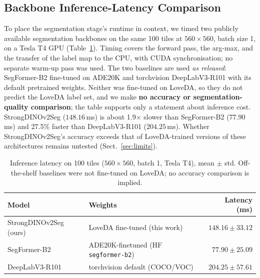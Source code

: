 \documentclass[runningheads]{llncs}
\begin{document}
\subsection{Backbone Inference-Latency Comparison}
To place the segmentation stage's runtime in context, we timed two publicly available segmentation backbones on the same 100 tiles at $560\times560$, batch size 1, on a Tesla T4 GPU (Table~\ref{tab:lat}). Timing covers the forward pass, the arg-max, and the transfer of the label map to the CPU, with CUDA synchronisation; no separate warm-up pass was used. The two baselines are used \emph{as released}: SegFormer-B2 fine-tuned on ADE20K and torchvision DeepLabV3-R101 with its default pretrained weights. Neither was fine-tuned on LoveDA, so they do not predict the LoveDA label set, and we make \textbf{no accuracy or segmentation-quality comparison}; the table supports only a statement about inference cost. StrongDINOv2Seg ($148.16$\,ms) is about 1.9$\times$ slower than SegFormer-B2 ($77.90$\,ms) and 27.5\% faster than DeepLabV3-R101 ($204.25$\,ms). Whether StrongDINOv2Seg's accuracy exceeds that of LoveDA-trained versions of these architectures remains untested (Sect.~\ref{sec:limits}).

\begin{table}[t]
\caption{Inference latency on 100 tiles ($560\times560$, batch 1, Tesla T4), mean $\pm$ std. Off-the-shelf baselines were not fine-tuned on LoveDA; no accuracy comparison is implied.}\label{tab:lat}
\centering
\begin{tabular}{llr}
\toprule
Model & Weights & Latency (ms)\\
\midrule
StrongDINOv2Seg (ours) & LoveDA fine-tuned (this work) & $148.16\pm33.12$\\
SegFormer-B2 & ADE20K-finetuned (HF \texttt{segformer-b2}) & $77.90\pm25.09$\\
DeepLabV3-R101 & torchvision default (COCO/VOC) & $204.25\pm57.61$\\
\bottomrule
\end{tabular}
\end{table}
\end{document}
